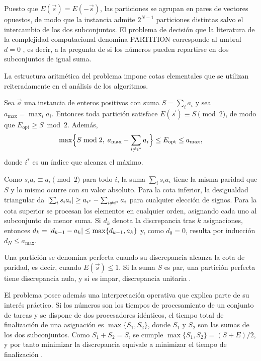 Puesto que $E(\vec{s}) = E(-\vec{s})$, las particiones se agrupan en pares de vectores opuestos, de modo que la instancia admite $2^{N-1}$ particiones distintas salvo el intercambio de los dos subconjuntos. El problema de decisión que la literatura de la complejidad computacional denomina PARTITION corresponde al umbral $d = 0$ \parencite{garey1979}, es decir, a la pregunta de si los números pueden repartirse en dos subconjuntos de igual suma.

La estructura aritmética del problema impone cotas elementales que se utilizan reiteradamente en el análisis de los algoritmos.

\begin{lemma}\label{lem:bounds}
Sea $\vec{a}$ una instancia de enteros positivos con suma $S = \sum_i a_i$ y sea $a_{\max} = \max_i a_i$. Entonces toda partición satisface $E(\vec{s}) \equiv S \pmod 2$, de modo que $E_{\mathrm{opt}} \geq S \bmod 2$. Además,
\[
    \max\Bigl\{S \bmod 2,\; a_{\max} - \sum_{i \neq i^\ast} a_i\Bigr\} \leq E_{\mathrm{opt}} \leq a_{\max},
\]
donde $i^\ast$ es un índice que alcanza el máximo.
\end{lemma}

\begin{demostracion}
Como $s_i a_i \equiv a_i \pmod 2$ para todo $i$, la suma $\sum_i s_i a_i$ tiene la misma paridad que $S$ y lo mismo ocurre con su valor absoluto. Para la cota inferior, la desigualdad triangular da $\left\lvert \sum_i s_i a_i \right\rvert \geq a_{i^\ast} - \sum_{i \neq i^\ast} a_i$ para cualquier elección de signos. Para la cota superior se procesan los elementos en cualquier orden, asignando cada uno al subconjunto de menor suma. Si $d_k$ denota la discrepancia tras $k$ asignaciones, entonces $d_k = \left\lvert d_{k-1} - a_k \right\rvert \leq \max\{d_{k-1}, a_k\}$ y, como $d_0 = 0$, resulta por inducción $d_N \leq a_{\max}$.
\end{demostracion}

Una partición se denomina perfecta cuando su discrepancia alcanza la cota de paridad, es decir, cuando $E(\vec{s}) \leq 1$. Si la suma $S$ es par, una partición perfecta tiene discrepancia nula, y si es impar, discrepancia unitaria \parencite{mertens2001,borgs2001}.

El problema posee además una interpretación operativa que explica parte de su interés práctico. Si los números son los tiempos de procesamiento de un conjunto de tareas y se dispone de dos procesadores idénticos, el tiempo total de finalización de una asignación es $\max\{S_1, S_2\}$, donde $S_1$ y $S_2$ son las sumas de los dos subconjuntos. Como $S_1 + S_2 = S$, se cumple $\max\{S_1, S_2\} = (S + E)/2$, y por tanto minimizar la discrepancia equivale a minimizar el tiempo de finalización \parencite{korf1998}.

